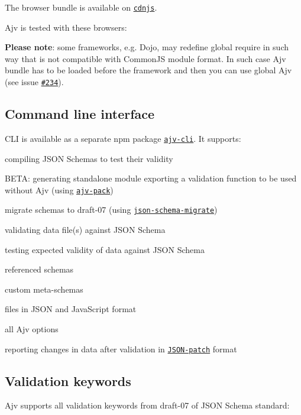 The browser bundle is available on \href{https://cdnjs.com/libraries/ajv}{\tt cdnjs}.

Ajv is tested with these browsers\+:

\href{https://saucelabs.com/u/epoberezkin}{\tt }

{\bfseries Please note}\+: some frameworks, e.\+g. Dojo, may redefine global require in such way that is not compatible with Common\+JS module format. In such case Ajv bundle has to be loaded before the framework and then you can use global Ajv (see issue \href{https://github.com/epoberezkin/ajv/issues/234}{\tt \#234}).

\subsection*{Command line interface}

C\+LI is available as a separate npm package \href{https://github.com/jessedc/ajv-cli}{\tt ajv-\/cli}. It supports\+:


\begin{DoxyItemize}
\item compiling J\+S\+ON Schemas to test their validity
\item B\+E\+TA\+: generating standalone module exporting a validation function to be used without Ajv (using \href{https://github.com/epoberezkin/ajv-pack}{\tt ajv-\/pack})
\item migrate schemas to draft-\/07 (using \href{https://github.com/epoberezkin/json-schema-migrate}{\tt json-\/schema-\/migrate})
\item validating data file(s) against J\+S\+ON Schema
\item testing expected validity of data against J\+S\+ON Schema
\item referenced schemas
\item custom meta-\/schemas
\item files in J\+S\+ON and Java\+Script format
\item all Ajv options
\item reporting changes in data after validation in \href{https://tools.ietf.org/html/rfc6902}{\tt J\+S\+O\+N-\/patch} format
\end{DoxyItemize}

\subsection*{Validation keywords}

Ajv supports all validation keywords from draft-\/07 of J\+S\+ON Schema standard\+:


